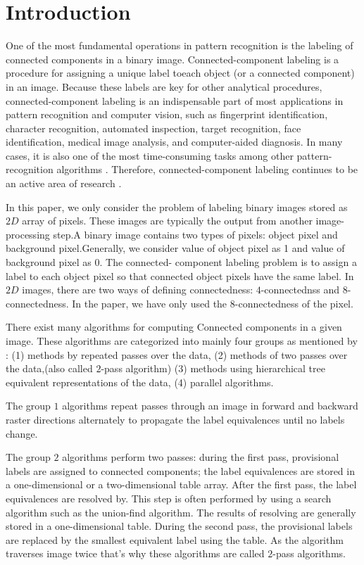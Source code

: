 \section{Introduction}

One of the most fundamental operations in pattern recognition is the labeling of connected components in a binary image.
Connected-component labeling is a procedure for assigning a unique label toeach object (or a connected component) in 
an image. Because these labels are key for other analytical procedures, connected-component labeling is an 
indispensable part of most applications in pattern recognition and computer vision, such as fingerprint identification,
character recognition, automated inspection, target recognition, face identification, medical image analysis, and 
computer-aided diagnosis. In many cases, it is also one of the most time-consuming tasks among other 
pattern-recognition algorithms \cite{Alnuweiri1992_Parallel}. Therefore, connected-component labeling continues 
to be an active area of research \cite{Gonzales_Digital,Agarwal2006_Efficient,Chang2004_Linear,Hayashi2001_Fast,
Hu2005_Fast,Knop1998_Parallel,Moga1997_Parallel,Wang2003_Parallel}.

In this paper, we only consider the problem of labeling binary images stored as $2D$ array of pixels. These images are 
typically the output from another image-processing step.A binary image contains two types of pixels: object pixel and 
background pixel.Generally, we consider value of object pixel as 1 and value of background pixel as 0. The connected-
component labeling problem is to assign a label to each object pixel so that connected object pixels have the same label.
In $2D$ images, there are two ways of defining connectedness: $4$-connectednss and $8$-connectedness. In the paper, we have 
only used the $8$-connectedness of the pixel.

There exist many algorithms for computing Connected components in a given image. These algorithms are categorized into
mainly four groups as mentioned by \cite{Suzuki2003_Linear}: (1) methods by repeated passes over the data, (2) methods 
of two passes over the data,(also called $2$-pass algorithm) (3) methods using hierarchical tree equivalent representations 
of the data, (4) parallel algorithms.

The group $1$ algorithms repeat passes through an image in forward and backward raster directions alternately to propagate 
the label equivalences until no labels change.

The group $2$ algorithms perform two passes: during the first pass, provisional labels are assigned to connected components;
the label equivalences are stored in a one-dimensional or a two-dimensional table array. After the first pass, the label 
equivalences are resolved by. This step is often performed by using a search algorithm such as the union-find algorithm.
The results of resolving are generally stored in a one-dimensional table. During the second pass, the provisional labels are 
replaced by the smallest equivalent label using the table. As the algorithm traverses image twice that's why these algorithms 
are called $2$-pass algorithms.

